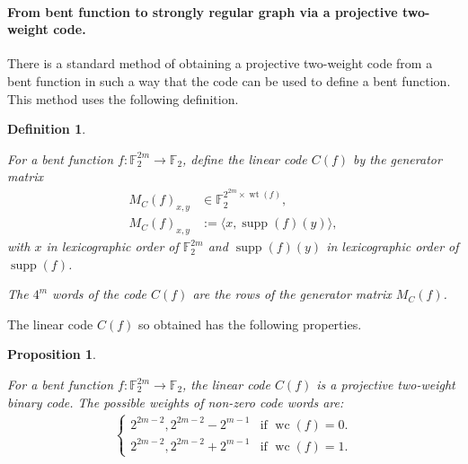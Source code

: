 \documentclass[12pt,a4paper]{article}
\newcommand{\mb}[1]{\mathbb{#1}}
\newcommand{\F}{\mb{F}}
\newcommand{\To}{\rightarrow}
\newcommand{\support}[1]{\operatorname{supp}\left(#1\right)}
\newcommand{\weight}[1]{\operatorname{wt}\left(#1\right)}
\newcommand{\weightclass}[1]{\operatorname{wc}\left(#1\right)}
\newtheorem{Proposition}{Proposition}
\newtheorem{Definition}{Definition}
\begin{document}
\paragraph*{From bent function to strongly regular graph via a projective two-weight code.}
There is a standard method of obtaining a projective two-weight code from a bent function in such a way that
the code can be used to define a bent function.
This method uses the following definition.
\begin{Definition}
\label{def-bent-two-weight-code}
\cite[Corollary 10]{DinD15class}

For a bent function $f : \F_2^{2m} \To \F_2$,
define the linear code $C(f)$ by the generator matrix
\begin{align*}
M_C(f)_{x,y} &\in \F_2^{2^{2m} \times \weight{f}},
\\
M_C(f)_{x,y} &:= \langle x, \support{f}(y) \rangle,
\end{align*}
with $x$ in lexicographic order of $\F_2^{2m}$
and $\support{f}(y)$ in lexicographic order of $\support{f}$.

The $4^m$ words of the code $C(f)$ are the rows of the generator matrix $M_C(f)$.
\end{Definition}

The linear code $C(f)$ so obtained has the following properties.
%
\begin{Proposition}
\cite[Corollary 10]{DinD15class}

For a bent function $f : \F_2^{2m} \To \F_2$, the linear code $C(f)$
is a projective two-weight binary code.
%
%
The possible weights of non-zero code words are:
\begin{align*}
\begin{cases}
2^{2m-2}, 2^{2m-2} - 2^{m-1} & \text{if~} \weightclass{f}=0.
\\
2^{2m-2}, 2^{2m-2} + 2^{m-1} & \text{if~} \weightclass{f}=1.
\end{cases}
\end{align*}
%
\end{Proposition}
%
%
\end{document}

